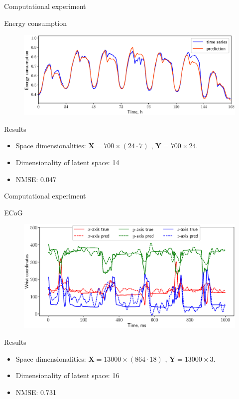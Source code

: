 \documentclass[9pt]{beamer}
\newcommand{\bY}{\mathbf{Y}}
\newcommand{\bX}{\mathbf{X}}
\begin{document}
\begin{frame}{Computational experiment}
	\begin{block}{Energy consumption}
	\begin{figure}
		\includegraphics[width=0.8\linewidth]{figs/energy_prediction_pres.eps}
	\end{figure}
	\vspace{-0.5cm}
	\end{block}
	\begin{block}{Results}
	\begin{itemize}
		\item Space dimensionalities: $\bX = 700 \times (24 \cdot 7)$ , $\bY = 700 \times 24$.
		\item Dimensionality of latent space: 14
		\item NMSE: 0.047
	\end{itemize}
	\end{block}
\end{frame}
\begin{frame}{Computational experiment}
	\begin{block}{ECoG}
	\begin{figure}
		\includegraphics[width=0.8\linewidth]{figs/ecog_prediction_pres.eps}
	\end{figure}
	\end{block}
	\begin{block}{Results}
		\begin{itemize}
			\item Space dimensionalities: $\bX = 13000 \times (864 \cdot 18)$ , $\bY = 13000 \times 3$.
			\item Dimensionality of latent space: 16
			\item NMSE: 0.731
		\end{itemize}
	\end{block}
\end{frame}
\end{document}
